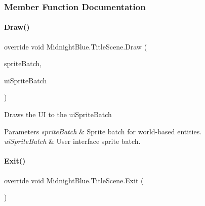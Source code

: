 \subsubsection{Member Function Documentation}
\hypertarget{class_midnight_blue_1_1_title_scene_a03fa806a36226ec5fd0ce09870109c18}{}\label{class_midnight_blue_1_1_title_scene_a03fa806a36226ec5fd0ce09870109c18} 
\paragraph{\texorpdfstring{Draw()}{Draw()}}
{\footnotesize\ttfamily override void Midnight\+Blue.\+Title\+Scene.\+Draw (\begin{DoxyParamCaption}\item[{Sprite\+Batch}]{sprite\+Batch,  }\item[{Sprite\+Batch}]{ui\+Sprite\+Batch }\end{DoxyParamCaption})\hspace{0.3cm}{\ttfamily [inline]}}



Draws the UI to the ui\+Sprite\+Batch 


\begin{DoxyParams}{Parameters}
{\em sprite\+Batch} & Sprite batch for world-\/based entities.\\
\hline
{\em ui\+Sprite\+Batch} & User interface sprite batch.\\
\hline
\end{DoxyParams}
\hypertarget{class_midnight_blue_1_1_title_scene_aed29e37e9f849cc8f8443bae057a8eb8}{}\label{class_midnight_blue_1_1_title_scene_aed29e37e9f849cc8f8443bae057a8eb8} 
\paragraph{\texorpdfstring{Exit()}{Exit()}}
{\footnotesize\ttfamily override void Midnight\+Blue.\+Title\+Scene.\+Exit (\begin{DoxyParamCaption}{ }\end{DoxyParamCaption})\hspace{0.3cm}{\ttfamily [inline]}}



